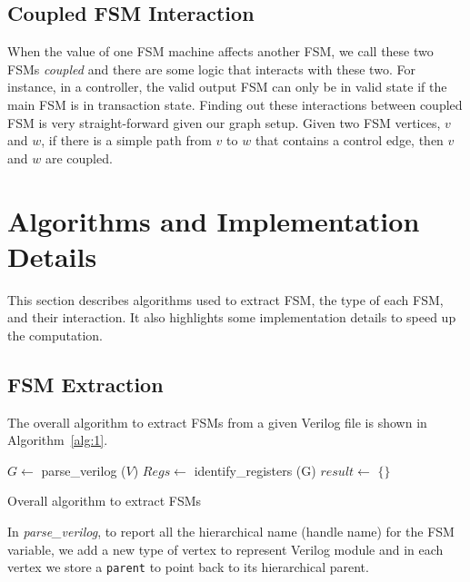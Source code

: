 \documentclass{article}
\begin{document}
\subsection{Coupled FSM Interaction}
When the value of one FSM machine affects another FSM, we call these two FSMs \textit{coupled}
and there are some logic that interacts with these two. For instance, in a controller,
the valid output FSM can only be in valid state if the main FSM is in transaction state.
Finding out these interactions between coupled FSM is very straight-forward given our graph setup.
Given two FSM vertices, $v$ and $w$, if there is a simple path from $v$ to $w$ that contains
a control edge, then $v$ and $w$ are coupled.


\section{Algorithms and Implementation Details}
This section describes algorithms used to extract FSM, the type of each FSM, and their interaction.
It also highlights some implementation details to speed up the computation.

\subsection{FSM Extraction}

The overall algorithm to extract FSMs from a given Verilog file is shown in Algorithm~\ref{alg:1}.

\begin{algorithm}[!tbh]\label{alg:1}
    $G \gets$ parse\_verilog ($V$)\;
    $Regs \gets$ identify\_registers (G)\;
    $result \gets$ $\{\}$\;
    \;
 \caption{Overall algorithm to extract FSMs}
\end{algorithm}

In \textit{parse\_verilog}, to report all the hierarchical name (handle name) for the FSM variable,
we add a new type of vertex to represent Verilog module and in each vertex we store a
\texttt{parent} to point back to its hierarchical parent.
\end{document}
